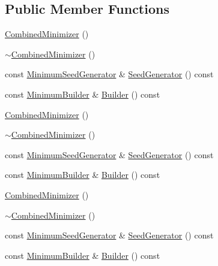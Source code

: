 \subsection*{Public Member Functions}
\begin{DoxyCompactItemize}
\item 
\mbox{\hyperlink{classROOT_1_1Minuit2_1_1CombinedMinimizer_a9e94be9d301a4db910252f4856c34801}{Combined\+Minimizer}} ()
\item 
\mbox{\hyperlink{classROOT_1_1Minuit2_1_1CombinedMinimizer_a09de1afbff4418ffaf7b94e625243cd1}{$\sim$\+Combined\+Minimizer}} ()
\item 
const \mbox{\hyperlink{classROOT_1_1Minuit2_1_1MinimumSeedGenerator}{Minimum\+Seed\+Generator}} \& \mbox{\hyperlink{classROOT_1_1Minuit2_1_1CombinedMinimizer_a667ce6c321b6948d37087a2ac06be58c}{Seed\+Generator}} () const
\item 
const \mbox{\hyperlink{classROOT_1_1Minuit2_1_1MinimumBuilder}{Minimum\+Builder}} \& \mbox{\hyperlink{classROOT_1_1Minuit2_1_1CombinedMinimizer_a73befc9c0bdfe8c9f09638505772c5ed}{Builder}} () const
\item 
\mbox{\hyperlink{classROOT_1_1Minuit2_1_1CombinedMinimizer_a9e94be9d301a4db910252f4856c34801}{Combined\+Minimizer}} ()
\item 
\mbox{\hyperlink{classROOT_1_1Minuit2_1_1CombinedMinimizer_a09de1afbff4418ffaf7b94e625243cd1}{$\sim$\+Combined\+Minimizer}} ()
\item 
const \mbox{\hyperlink{classROOT_1_1Minuit2_1_1MinimumSeedGenerator}{Minimum\+Seed\+Generator}} \& \mbox{\hyperlink{classROOT_1_1Minuit2_1_1CombinedMinimizer_a667ce6c321b6948d37087a2ac06be58c}{Seed\+Generator}} () const
\item 
const \mbox{\hyperlink{classROOT_1_1Minuit2_1_1MinimumBuilder}{Minimum\+Builder}} \& \mbox{\hyperlink{classROOT_1_1Minuit2_1_1CombinedMinimizer_a73befc9c0bdfe8c9f09638505772c5ed}{Builder}} () const
\item 
\mbox{\hyperlink{classROOT_1_1Minuit2_1_1CombinedMinimizer_a9e94be9d301a4db910252f4856c34801}{Combined\+Minimizer}} ()
\item 
\mbox{\hyperlink{classROOT_1_1Minuit2_1_1CombinedMinimizer_a09de1afbff4418ffaf7b94e625243cd1}{$\sim$\+Combined\+Minimizer}} ()
\item 
const \mbox{\hyperlink{classROOT_1_1Minuit2_1_1MinimumSeedGenerator}{Minimum\+Seed\+Generator}} \& \mbox{\hyperlink{classROOT_1_1Minuit2_1_1CombinedMinimizer_a667ce6c321b6948d37087a2ac06be58c}{Seed\+Generator}} () const
\item 
const \mbox{\hyperlink{classROOT_1_1Minuit2_1_1MinimumBuilder}{Minimum\+Builder}} \& \mbox{\hyperlink{classROOT_1_1Minuit2_1_1CombinedMinimizer_a73befc9c0bdfe8c9f09638505772c5ed}{Builder}} () const
\end{DoxyCompactItemize}


